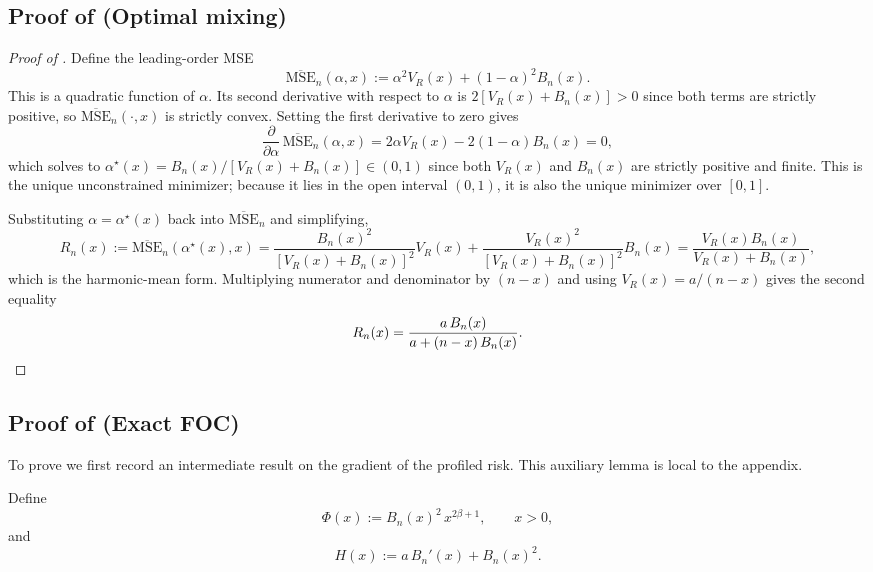 \subsection{Proof of \texorpdfstring{}{Proposition~\ref{prop:mix}} (Optimal mixing)}\label{proof:mix}

\begin{proof}[Proof of ]
Define the leading-order MSE
\[
\overline{\mathrm{MSE}}_n(\alpha, x) := \alpha^2 V_R(x) + (1-\alpha)^2 B_n(x).
\]
This is a quadratic function of $\alpha$. Its second derivative with respect to $\alpha$ is $2[V_R(x) + B_n(x)] > 0$ since both terms are strictly positive, so $\overline{\mathrm{MSE}}_n(\cdot, x)$ is strictly convex. Setting the first derivative to zero gives
\[
\frac{\partial}{\partial \alpha}\, \overline{\mathrm{MSE}}_n(\alpha, x)
= 2\alpha V_R(x) - 2(1-\alpha) B_n(x) = 0,
\]
which solves to $\alpha^\star(x) = B_n(x) / [V_R(x) + B_n(x)] \in (0,1)$ since both $V_R(x)$ and $B_n(x)$ are strictly positive and finite. This is the unique unconstrained minimizer; because it lies in the open interval $(0,1)$, it is also the unique minimizer over $[0,1]$.

Substituting $\alpha = \alpha^\star(x)$ back into $\overline{\mathrm{MSE}}_n$ and simplifying,
\[
R_n(x) := \overline{\mathrm{MSE}}_n(\alpha^\star(x), x)
= \frac{B_n(x)^2}{[V_R(x)+B_n(x)]^2} V_R(x)
+ \frac{V_R(x)^2}{[V_R(x)+B_n(x)]^2} B_n(x)
= \frac{V_R(x) B_n(x)}{V_R(x) + B_n(x)},
\]
which is the harmonic-mean form. Multiplying numerator and denominator by $(n-x)$ and using $V_R(x) = a/(n-x)$ gives the second equality
\[
R_n(x) = \frac{a\, B_n(x)}{a + (n-x)\, B_n(x)}. \qedhere
\]
\end{proof}


\subsection{Proof of \texorpdfstring{}{Proposition~\ref{prop:foc}} (Exact FOC)}\label{proof:foc}

To prove  we first record an intermediate result on the gradient of the profiled risk. This auxiliary lemma is local to the appendix.

Define
\begin{equation}\label{eq:Phi-def-app}
\Phi(x) := B_n(x)^2\, x^{2\beta+1}, \qquad x > 0,
\end{equation}
and
\begin{equation}\label{eq:H-def-app}
H(x) := a\, B_n'(x) + B_n(x)^2.
\end{equation}

